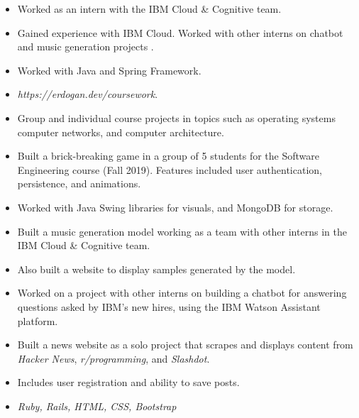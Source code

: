 
\begin{itemize}
    \item Worked as an intern with the IBM Cloud \& Cognitive team. 
    \item Gained experience with IBM Cloud. Worked with other interns on chatbot and music generation projects . 
\end{itemize}

\begin{itemize}
    \item Worked with Java and Spring Framework. 
\end{itemize}


\begin{itemize}
	\item \textit{https://erdogan.dev/coursework}.
	\item Group and individual course projects in topics such as operating systems computer networks, and computer architecture.  
\end{itemize}

\begin{itemize}
	\item Built a brick-breaking game in a group of 5 students for the Software Engineering course (Fall 2019). Features included user authentication, persistence, and animations.
	\item Worked with Java Swing libraries for visuals, and MongoDB for storage. 
\end{itemize}

\begin{itemize}
	\item Built a music generation model working as a team with other interns in the IBM Cloud \& Cognitive team.
	\item Also built a website to display samples generated by the model. 
\end{itemize}

\begin{itemize}
	\item Worked on a project with other interns on building a chatbot for answering questions asked by IBM's new hires, using the IBM Watson Assistant platform. 
\end{itemize}

\begin{itemize}
	\item Built a news website as a solo project that scrapes and displays content from \textit{Hacker News}, \textit{r/programming}, and \textit{Slashdot}.
	\item Includes user registration and ability to save posts.
	\item \textit{Ruby, Rails, HTML, CSS, Bootstrap}
\end{itemize}


    

